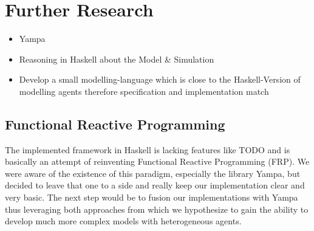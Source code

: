 \section{Further Research}
\begin{itemize}
	\item Yampa
	\item Reasoning in Haskell about the Model \& Simulation
	\item Develop a small modelling-language which is close to the Haskell-Version of modelling agents therefore specification and implementation match
\end{itemize} 

\subsection{Functional Reactive Programming}
The implemented framework in Haskell is lacking features like TODO and is basically an attempt of reinventing Functional Reactive Programming (FRP). We were aware of the existence of this paradigm, especially the library Yampa, but decided to leave that one to a side and really keep our implementation clear and very basic. The next step would be to fusion our implementations with Yampa thus leveraging both approaches from which we hypothesize to gain the ability to develop much more complex models with heterogeneous agents.